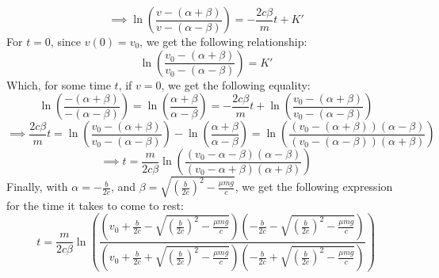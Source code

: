 \documentclass{article}
\begin{document}
$$\implies \ln\left(\frac{v-(\alpha+\beta)}{v-(\alpha-\beta)}\right) = -\frac{2c\beta}{m}t+K'$$
For $t=0$, since $v(0)=v_0$, we get the following relationship:
$$\ln\left(\frac{v_0-(\alpha+\beta)}{v_0-(\alpha-\beta)}\right)=K'$$
Which, for some time $t$, if $v=0$, we get the following equality:
$$\ln\left(\frac{-(\alpha+\beta)}{-(\alpha-\beta)}\right) = \ln\left(\frac{\alpha+\beta}{\alpha-\beta}\right) = -\frac{2c\beta}{m}t + \ln\left(\frac{v_0-(\alpha+\beta)}{v_0-(\alpha-\beta)}\right)$$
$$\implies \frac{2c\beta}{m}t = \ln\left(\frac{v_0-(\alpha+\beta)}{v_0-(\alpha-\beta)}\right)-\ln\left(\frac{\alpha+\beta}{\alpha-\beta}\right)=\ln\left(\frac{(v_0-(\alpha+\beta))(\alpha-\beta)}{(v_0-(\alpha-\beta))(\alpha+\beta)}\right)$$
$$\implies t=\frac{m}{2c\beta}\ln\left(\frac{(v_0-\alpha-\beta)(\alpha-\beta)}{(v_0-\alpha+\beta)(\alpha+\beta)}\right)$$
Finally, with $\alpha=-\frac{b}{2c}$, and $\beta=\sqrt{\left(\frac{b}{2c}\right)^2-\frac{\mu mg}{c}}$, we get the following expression for the time it takes to come to rest:
$$t = \frac{m}{2c\beta}\ln\left(\frac{\left(v_0+\frac{b}{2c}-\sqrt{\left(\frac{b}{2c}\right)^2-\frac{\mu mg}{c}}\right)\left(-\frac{b}{2c}-\sqrt{\left(\frac{b}{2c}\right)^2-\frac{\mu mg}{c}}\right)}{\left(v_0+\frac{b}{2c}+\sqrt{\left(\frac{b}{2c}\right)^2-\frac{\mu mg}{c}}\right)\left(-\frac{b}{2c}+\sqrt{\left(\frac{b}{2c}\right)^2-\frac{\mu mg}{c}}\right)}\right)$$

\end{document}
